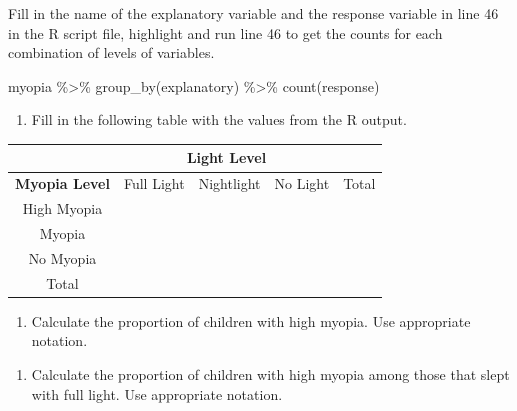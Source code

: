 \documentclass[
]{report}
\newenvironment{Shaded}{\begin{snugshade}}{\end{snugshade}}
\newcommand{\FunctionTok}[1]{\textcolor[rgb]{0.00,0.00,0.00}{#1}}
\newcommand{\NormalTok}[1]{#1}
\newcommand{\SpecialCharTok}[1]{\textcolor[rgb]{0.00,0.00,0.00}{#1}}
\providecommand{\tightlist}{%
  \setlength{\itemsep}{0pt}\setlength{\parskip}{0pt}}
\begin{document}
\vspace{0.8in}

Fill in the name of the explanatory variable and the response variable in line 46 in the R script file, highlight and run line 46 to get the counts for each combination of levels of variables.

\begin{Shaded}
\begin{Highlighting}[]
\NormalTok{myopia }\SpecialCharTok{\%\textgreater{}\%} \FunctionTok{group\_by}\NormalTok{(explanatory) }\SpecialCharTok{\%\textgreater{}\%} \FunctionTok{count}\NormalTok{(response)}
\end{Highlighting}
\end{Shaded}

\begin{enumerate}
\def\labelenumi{\arabic{enumi}.}
\setcounter{enumi}{10}
\tightlist
\item
  Fill in the following table with the values from the R output.
\end{enumerate}

\begin{center}
\begingroup
\setlength{\tabcolsep}{14pt} %
\renewcommand{\arraystretch}{2} %
\begin{tabular}{|c|c|c|c|c|}
\hline
 & \multicolumn{3}{|c|}{\textbf{Light Level}} & \\ \hline
\textbf{Myopia Level} & Full Light & Nightlight & No Light & Total \\ \hline
 High Myopia & & & & \\ \hline
 Myopia & & & & \\ \hline
 No Myopia & & & & \\ \hline
 Total & & & & \\ \hline  
\end{tabular}
\endgroup
\end{center}

\begin{enumerate}
\def\labelenumi{\arabic{enumi}.}
\setcounter{enumi}{11}
\tightlist
\item
  Calculate the proportion of children with high myopia. Use appropriate notation.
\end{enumerate}

\vspace{0.3in}

\begin{enumerate}
\def\labelenumi{\arabic{enumi}.}
\setcounter{enumi}{12}
\tightlist
\item
  Calculate the proportion of children with high myopia among those that slept with full light. Use appropriate notation.
\end{enumerate}
\end{document}
